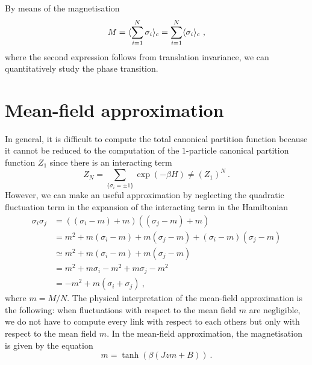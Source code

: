     By means of the magnetisation
    \begin{equation}\label{ph:m}
        M = \langle\sum_{i=1}^N \sigma_i\rangle_c = \sum_{i=1}^N \langle\sigma_i\rangle_c ~,
    \end{equation}
    where the second expression follows from translation invariance, we can quantitatively study the phase transition.

\section{Mean-field approximation} 

    In general, it is difficult to compute the total canonical partition function because it cannot be reduced to the computation of the $1$-particle canonical partition function $Z_1$ since there is an interacting term
    \begin{equation*}
        Z_N = \sum_{\{\sigma_i = \pm 1\}} \exp(- \beta H) \neq (Z_1)^N ~.
    \end{equation*}
    However, we can make an useful approximation by neglecting the quadratic fluctuation term in the expansion of the interacting term in the Hamiltonian
    \begin{equation*}
    \begin{aligned}
        \sigma_i \sigma_j & = ((\sigma_i - m) + m)((\sigma_j - m) + m) \\ & = m^2 + m(\sigma_i - m) + m (\sigma_j - m) + (\sigma_i - m)(\sigma_j - m) \\ & \simeq m^2 + m(\sigma_i - m) + m (\sigma_j - m) \\ & = m^2 + m\sigma_i - m^2 + m \sigma_j - m^2 \\ & = - m^2 + m (\sigma_i + \sigma_j) ~,
    \end{aligned}
    \end{equation*}
    where $m = M / N$.
    The physical interpretation of the mean-field approximation is the following: when fluctuations with respect to the mean field $m$ are negligible, we do not have to compute every link with respect to each others but only with respect to the mean field $m$. In the mean-field approximation, the magnetisation is given by the equation 
    \begin{equation*}
        m = \tanh(\beta(Jzm + B)) ~.
    \end{equation*}
